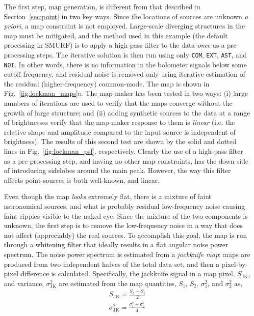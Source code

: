 \documentclass[useAMS,usenatbib,nofootinbib]{mn2e}
\newcommand{\model}[1]{\texttt{#1}}
\begin{document}
The first step, map generation, is different from that described in
Section~\ref{sec:point} in two key ways. Since the locations of
sources are unknown \emph{a priori}, a map constraint is not
employed. Large-scale diverging structures in the map must be
mitigated, and the method used in this example (the default processing
in SMURF) is to apply a high-pass filter to the data \emph{once} as a
pre-processing steps. The iterative solution is then run using only
\model{COM}, \model{EXT}, \model{AST}, and \model{NOI}. In other
words, there is no information in the bolometer signals below some
cutoff frequency, and residual noise is removed only using iterative
estimation of the residual (higher-frequency) common-mode. The map is
shown in Fig.~\ref{fig:lockman_maps}a. The map-maker has been tested
in two ways: (i) large numbers of iterations are used to verify that
the maps converge without the growth of large structure; and (ii)
adding synthetic sources to the data at a range of brightnesses verify
that the map-maker response to them is \emph{linear} (i.e. the
relative shape and amplitude compared to the input source is
independent of brightness). The results of this second test are shown
by the solid and dotted lines in Fig.~\ref{fig:lockman_psf},
respectively. Clearly the use of a high-pass filter as a
pre-processing step, and having no other map-constraints, has the
down-side of introducing sidelobes around the main peak. However, the
way this filter affects point-sources is both well-known, and linear.


Even though the map \emph{looks} extremely flat, there is a mixture of
faint astronomical sources, and what is probably residual
low-frequency noise causing faint ripples visible to the naked
eye. Since the mixture of the two components is unknown, the first
step is to remove the low-frequency noise in a way that does not
affect (appreciably) the real sources. To accomplish this goal, the
map is run through a whitening filter that ideally results in a flat
angular noise power spectrum. The noise power spectrum is estimated
from a \emph{jackknife map}: maps are produced from two independent
halves of the total data set, and then a pixel-by-pixel difference is
calculated. Specifically, the jackknife signal in a map pixel,
$S_\mathrm{JK}$, and variance, $\sigma^2_\mathrm{JK}$ are estimated
from the map quantities, $S_1$, $S_2$, $\sigma^2_1$, and $\sigma^2_2$
as,
%
\begin{eqnarray}
S_\mathrm{JK} = \frac{S_1 - S_2}{2} \\
\sigma^2_\mathrm{JK} = \frac{\sigma^2_1 + \sigma^2_2}{4}
\end{eqnarray}
\end{document}
